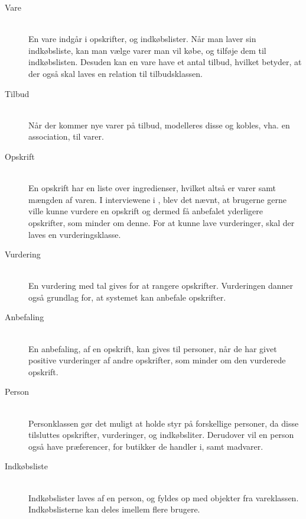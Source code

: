 \begin{description}
\item[Vare]\hfill\\
En vare indgår i opskrifter, og indkøbslister.
Når man laver sin indkøbsliste, kan man vælge varer man vil købe, og tilføje dem til indkøbslisten.
Desuden kan en vare have et antal tilbud, hvilket betyder, at der også skal laves en relation til tilbudsklassen.

\item[Tilbud]\hfill\\
Når der kommer nye varer på tilbud, modelleres disse og kobles, vha. en association, til varer.

\item[Opskrift]\hfill\\
En opskrift har en liste over ingredienser, hvilket altså er varer samt mængden af varen.
I interviewene i , blev det nævnt, at brugerne gerne ville kunne vurdere en opskrift og dermed få anbefalet yderligere opskrifter, som minder om denne.
For at kunne lave vurderinger, skal der laves en vurderingsklasse.

\item[Vurdering]\hfill\\
En vurdering med tal gives for at rangere opskrifter. 
Vurderingen danner også grundlag for, at systemet kan anbefale opskrifter.

\item[Anbefaling]\hfill\\
En anbefaling, af en opskrift, kan gives til personer, når de har givet positive vurderinger af andre opskrifter, som minder om den vurderede opskrift.

\item[Person]\hfill\\
Personklassen gør det muligt at holde styr på forskellige personer, da disse tilsluttes opskrifter, vurderinger, og indkøbsliter.
Derudover vil en person også have præferencer, for butikker de handler i, samt madvarer.

\item[Indkøbsliste]\hfill\\
Indkøbslister laves af en person, og fyldes op med objekter fra vareklassen.
Indkøbslisterne kan deles imellem flere brugere.
\end{description}


